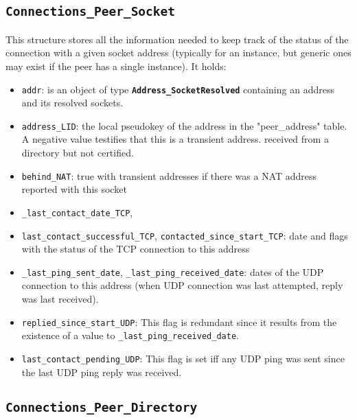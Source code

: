 \documentclass{book}
\newcommand{\cls}[1]{{\tt\bf #1}}
\newcommand{\mmb}[1]{{\tt #1}}
\begin{document}
\subsection{\cls{Connections\_Peer\_Socket}}
This structure stores all the information needed to keep track of the status of the connection with a given socket address (typically for an instance, but generic ones may exist if the peer has a single instance). It holds:
\begin{itemize}
\item
\mmb{addr}: is an object of type \cls{Address\_SocketResolved} containing an address and its resolved sockets.
\item
\mmb{address\_LID}: the local pseudokey of the address in the "peer\_address" table. A negative value testifies that this is a transient address.
received from a directory but not certified.
\item
\mmb{behind\_NAT}: true with transient addresses if there was a NAT address reported with this socket
\item
\mmb{\_last\_contact\_date\_TCP}, 
\item
\mmb{last\_contact\_successful\_TCP}, 
\mmb{contacted\_since\_start\_TCP}: date
and flags with the status of the TCP connection to this address
\item
\mmb{\_last\_ping\_sent\_date}, \mmb{\_last\_ping\_received\_date}: dates of the UDP connection to this address (when UDP connection was last attempted,  reply was last received).
\item
\mmb{replied\_since\_start\_UDP}:
This flag is redundant since it results from the existence of a value to  \mmb{\_last\_ping\_received\_date}.
\item
\mmb{last\_contact\_pending\_UDP}:
This flag is set iff any UDP ping was sent since the last UDP ping reply was received.
\end{itemize}

\subsection{\cls{Connections\_Peer\_Directory}}
\end{document}
